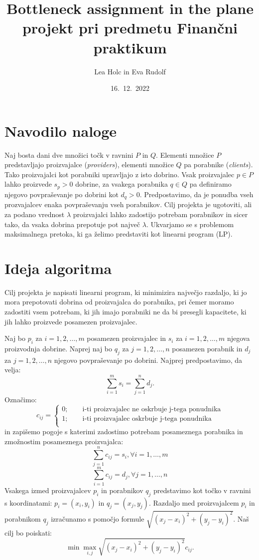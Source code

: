 \documentclass[a4paper, pt14]{article}
\begin{document}
\title{%
  Bottleneck assignment in the plane \\
  \large projekt pri predmetu Finančni praktikum}
\author{Lea Holc in Eva Rudolf}
\date{16.\ 12.\ 2022}

\maketitle

\section{Navodilo naloge}
Naj bosta dani dve množici točk v ravnini $P$ in $Q$. Elementi množice $P$ predstavljajo proizvajalce (\textsl{providers}), elementi množice $Q$ pa porabnike (\textsl{clients}). Tako proizvajalci kot porabniki upravljajo z isto dobrino. Vsak proizvajalec $p \in P$ lahko proizvede $s_p > 0$ dobrine, za vsakega porabnika $q \in Q$ pa definiramo njegovo povpraševanje po dobrini kot $d_q > 0$. Predpostavimo, da je ponudba vseh prozvajalcev enaka povpraševanju vseh porabnikov. Cilj projekta je ugotoviti, ali za podano vrednost $\lambda$ proizvajalci lahko zadostijo potrebam porabnikov in sicer tako, da vsaka dobrina prepotuje pot največ $\lambda$. Ukvarjamo se s problemom maksimalnega pretoka, ki ga želimo predstaviti kot linearni program (LP).

\section{Ideja algoritma}
Cilj projekta je napisati linearni program, ki minimizira največjo razdaljo, ki jo mora prepotovati dobrina od proizvajalca do porabnika, pri čemer moramo zadostiti vsem potrebam, ki jih imajo porabniki ne da bi presegli kapacitete, ki jih lahko proizvede posamezen proizvajalec. 

Naj bo $p_i$ za $i=1,2,\dots,m$ posamezen proizvajalec in $s_i$ za $i=1,2,\dots,m$ njegova proizvodnja dobrine. Naprej naj bo $q_j$ za $j=1,2,\dots,n$ posamezen porabnik in $d_j$ za $j=1,2,\dots,n$ njegovo povpraševanje po dobrini. Najprej predpostavimo, da velja:
$$
\sum_{i=1}^m s_i = \sum_{j=1}^n d_j.
$$ 
Označimo: 
$$
c_{ij} = 
\begin{cases}
    0;\qquad \textrm{i-ti proizvajalec ne oskrbuje j-tega ponudnika} \\
    1;\qquad \textrm{i-ti proizvajalec oskrbuje j-tega ponudnika} \\
\end{cases} 
$$
in zapišemo pogoje s katerimi zadostimo potrebam posameznega porabnika in zmožnostim posameznega proizvajalca:
$$
\sum_{j=1}^n c_{ij} = s_i, \forall i = 1,\dots,m 
$$
$$
\sum_{i=1}^m c_{ij} = d_j, \forall j = 1,\dots,n 
$$
Vsakega izmed proizvajalcev $p_i$ in porabnikov $q_j$ predstavimo kot točko v ravnini s koordinatami: $p_i = (x_i,y_i)$ in $q_j = (x_j,y_j)$. Razdaljo med proizvajalcem $p_i$ in porabnikom $q_j$ izračunamo s pomočjo formule $\sqrt{(x_j-x_i)^2 + (y_j-y_i)^2}$. Naš cilj bo poiskati:
$$
\min \max_{i,j} \sqrt{(x_j-x_i)^2 + (y_j-y_i)^2}c_{ij}.
$$
\end{document}
